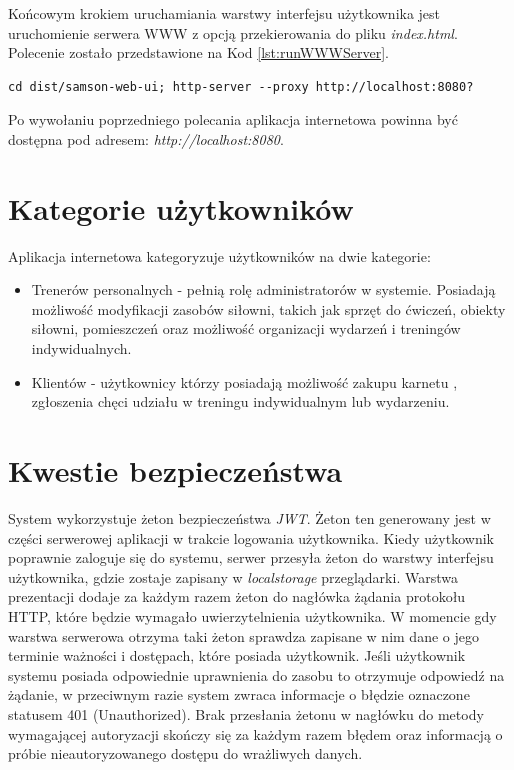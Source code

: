\documentclass[a4paper,twoside,12pt]{book}
\begin{document}
{Końcowym krokiem uruchamiania warstwy interfejsu użytkownika jest uruchomienie serwera WWW z opcją przekierowania do pliku \textit{index.html}. Polecenie zostało przedstawione na Kod \ref{lst:runWWWServer}.
\begin{lstlisting}[caption={Polecenie, które tworzy paczkę możliwą do uruchomienia przez serwer WWW}, label={lst:runWWWServer}]
	cd dist/samson-web-ui; http-server --proxy http://localhost:8080?
\end{lstlisting}

Po wywołaniu poprzedniego polecania aplikacja internetowa powinna być dostępna pod adresem: \textit{http://localhost:8080}.

\section {Kategorie użytkowników}

Aplikacja internetowa kategoryzuje użytkowników na dwie kategorie:
\begin{itemize}
	\item Trenerów personalnych - pełnią rolę administratorów w systemie. Posiadają możliwość modyfikacji zasobów siłowni, takich jak sprzęt do ćwiczeń, obiekty siłowni, pomieszczeń oraz możliwość organizacji wydarzeń i treningów indywidualnych.
	\item Klientów - użytkownicy którzy posiadają możliwość zakupu karnetu , zgłoszenia chęci udziału w treningu indywidualnym lub wydarzeniu.
\end{itemize}

\section {Kwestie bezpieczeństwa}

System wykorzystuje żeton bezpieczeństwa \textit{JWT}. Żeton ten generowany jest w części serwerowej aplikacji w trakcie logowania użytkownika. Kiedy użytkownik poprawnie zaloguje się do systemu, serwer przesyła żeton do warstwy interfejsu użytkownika, gdzie zostaje zapisany w \textit{localstorage} przeglądarki. Warstwa prezentacji dodaje za każdym razem żeton do nagłówka żądania protokołu HTTP, które będzie wymagało uwierzytelnienia użytkownika. W momencie gdy warstwa serwerowa otrzyma taki żeton sprawdza zapisane w nim dane o jego terminie ważności i dostępach, które posiada użytkownik. Jeśli użytkownik systemu posiada odpowiednie uprawnienia do zasobu to otrzymuje odpowiedź na żądanie, w przeciwnym razie system zwraca informacje o błędzie oznaczone statusem 401 (Unauthorized). Brak przesłania żetonu w nagłówku do metody wymagającej autoryzacji skończy się za każdym razem błędem oraz informacją o próbie nieautoryzowanego dostępu do wrażliwych danych.

}
\end{document}
